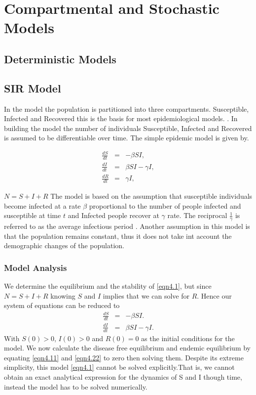 \chapter{Compartmental and Stochastic Models}
\section{Deterministic Models}

\section{SIR Model}

In the model the population is partitioned into three compartments. Susceptible, Infected and Recovered this is the basis for most epidemiological models. \citep{m1925applications}. In building the model the number of individuals Susceptible, Infected and Recovered is assumed to be differentiable over time.
The simple epidemic model is given by.
\begin{center}
\begin{equation} \label{eqn4.1}
\left.\begin{array}{ccl}
\frac{dS}{dt} &= &-\beta SI,\\
 \frac{dI}{dt} &=& \beta S I - \gamma  I, \\
 \frac{dR}{dt} &= &\gamma  I,
\end{array} \right. 
\end{equation}
\end{center}
$N = S + I + R$
The model is based on the assumption that susceptible individuals become infected at a rate $\beta$ proportional to the number of people infected and susceptible at time $t$ and Infected people recover at $\gamma$ rate. The reciprocal $\frac{1}{\gamma}$ is referred to as the average infectious period . Another assumption in this model is that the population remains constant, thus it does not take int account the demographic changes of the population.


\subsection{Model Analysis}
We determine the equilibrium and the stability of \ref{eqn4.1}, but since $N =S +I+R$ knowing $S$ and $I$ implies that we can solve for  $R$. Hence our system of equations can be reduced to 
\begin{align}
\frac{dS}{dt} &= &-\beta SI. \label{eqn4.11} \\
 \frac{dI}{dt} &=& \beta S I - \gamma  I \label{eqn4.22}.
\end{align}
 With $S(0) >0$, $I(0) > 0$ and $R(0) =0$ as the initial conditions for the model.
 We now calculate the disease free equilibrium and endemic equilibrium by equating \ref{eqn4.11} and \ref{eqn4.22} to zero then solving them. Despite its extreme simplicity, this model \ref{eqn4.1} cannot be solved explicitly.That is, we cannot obtain an exact analytical expression for the dynamics of S and I
though time, instead the model has to be solved numerically.

